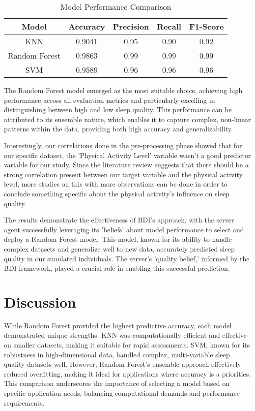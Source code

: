 \documentclass[conference]{IEEEtran}
\begin{document}
\begin{table}[ht]
\caption{Model Performance Comparison}
\centering
\begin{tabular}{|c|c|c|c|c|}
\hline
Model & Accuracy & Precision & Recall & F1-Score \\
\hline
KNN & 0.9041 & 0.95 & 0.90 & 0.92 \\
Random Forest & 0.9863 & 0.99 & 0.99 & 0.99 \\
SVM & 0.9589 & 0.96 & 0.96 & 0.96 \\
\hline
\end{tabular}
\label{tab:model_performance}
\end{table}

The Random Forest model emerged as the most suitable choice, achieving high performance across all evaluation metrics and particularly excelling in distinguishing between high and low sleep quality. This performance can be attributed to its ensemble nature, which enables it to capture complex, non-linear patterns within the data, providing both high accuracy and generalizability.

Interestingly, our correlations done in the pre-processing phase showed that for our specific dataset, the 'Physical Activity Level' variable wasn't a good predictor variable for our study. Since the literature review suggests that there should be a strong correlation present between our target variable and the physical activity level, more studies on this with more observations can be done in order to conclude something specific about the physical activity's influence on sleep quality.


The results demonstrate the effectiveness of BDI's approach, with the server agent successfully leveraging its 'beliefs' about model performance to select and deploy a Random Forest model. This model, known for its ability to handle complex datasets and generalize well to new data, accurately predicted sleep quality in our simulated individuals. The server's 'quality belief,' informed by the BDI framework, played a crucial role in enabling this successful prediction.

\section{Discussion}
While Random Forest provided the highest predictive accuracy, each model demonstrated unique strengths. KNN was computationally efficient and effective on smaller datasets, making it suitable for rapid assessments. SVM, known for its robustness in high-dimensional data, handled complex, multi-variable sleep quality datasets well. However, Random Forest’s ensemble approach effectively reduced overfitting, making it ideal for applications where accuracy is a priorities. This comparison underscores the importance of selecting a model based on specific application needs, balancing computational demands and performance requirements.
\end{document}
